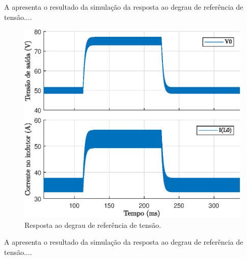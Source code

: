 





A  apresenta o resultado da simulação da resposta ao degrau de referência de tensão....

\begin{figure}[!ht]
	\centering
	\includegraphics[width=0.9\linewidth]{Figs/Buck1malha}
	\caption{Resposta ao degrau de referência de tensão.}
	\label{fig:buck1malha}
\end{figure}

A  apresenta o resultado da simulação da resposta ao degrau de referência de tensão....

